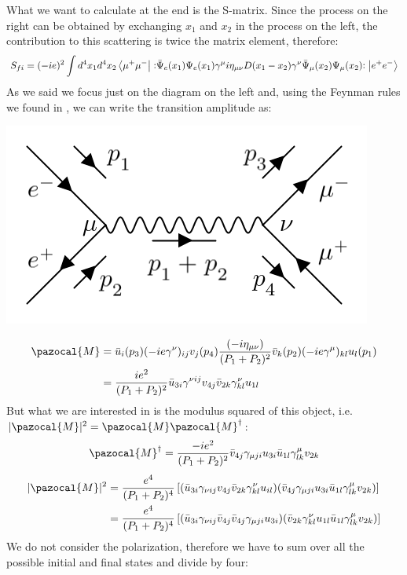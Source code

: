 \documentclass[../main.tex]{subfiles}
\begin{document}
What we want to calculate at the end is the S-matrix. Since the process on the right can be obtained by exchanging $x_1$ and $x_2$ in the process on the left, the contribution to this scattering is twice the matrix element, therefore:
\[
S_{fi}=(-ie)^2\int d^4x_1d^4x_2\bra{\mu^+\mu^-}\vcentcolon\mathrel{\bar{\Psi}_e(x_1)\Psi_e(x_1)\gamma^\mu i\eta_{\mu\nu}D(x_1-x_2)\gamma^\nu\bar{\Psi}_\mu(x_2)\Psi_\mu(x_2)}\vcentcolon\ket{e^+e^-}
\]
As we said we focus just on the diagram on the left and, using the Feynman rules we found in , we can write the transition amplitude as:\begin{marginfigure}
\includegraphics{Images/feynman(5).png}
\end{marginfigure}
\begin{align*}
\pazocal{M}&=\bar{u}_i(p_3)(-ie\gamma^\nu)_{ij}v_j(p_4)\frac{(-i\eta_{\mu\nu})}{(P_1+P_2)^2}\bar{v}_k(p_2)(-ie\gamma^\mu)_{kl}u_l(p_1)\\
&=\frac{ie^2}{(P_1+P_2)^2}\bar{u}_{3i}\gamma^{\nu ij}v_{4j}\bar{v}_{2k}\gamma^\nu_{kl}u_{1l}
\end{align*}
But what we are interested in is the modulus squared of this object, i.e. $|\pazocal{M}|^2=\pazocal{M}\pazocal{M}^\dagger$:
\[
\pazocal{M}^\dagger=\frac{-ie^2}{(P_1+P_2)^2}\bar{v}_{4j}\gamma_{\mu ji}u_{3i}\bar{u}_{1l}\gamma^\mu_{lk}v_{2k}
\]
\begin{align*}
|\pazocal{M}|^2&=\frac{e^4}{(P_1+P_2)^4}\left[(\bar{u}_{3i}\gamma_{\nu ij}v_{4j}\bar{v}_{2k}\gamma^\nu_{kl}u_{il})(\bar{v}_{4j}\gamma_{\mu ji}u_{3i}\bar{u}_{1l}\gamma^\mu_{lk}v_{2k})\right]\\
&=\frac{e^4}{(P_1+P_2)^4}\left[(\bar{u}_{3i}\gamma_{\nu ij}\bar{v}_{4j}\bar{v}_{4j}\gamma_{\mu ji}u_{3i})(\bar{v}_{2k}\gamma^\nu_{kl}u_{1l}\bar{u}_{1l}\gamma^\mu_{lk}v_{2k})\right]
\end{align*}
We do not consider the polarization, therefore we have to sum over all the possible initial and final states and divide by four:
\end{document}
